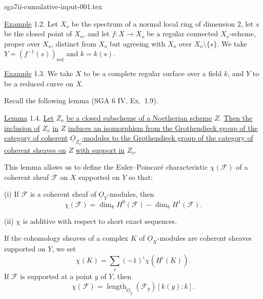 \begin{filecontents*}{sga7ii-cumulative-input-001.tex}

\underline{Example} 1.2. Let $X_o$ be the spectrum of a normal local ring of
dimension 2, let $s$ be the closed point of $X_o$, and let
$f:X\longrightarrow X_o$ be a regular connected $X_o$-scheme, proper over $X_o$,
distinct from $X_o$ but agreeing with $X_o$ over $X_o\setminus\{s\}$.  We take
$Y=(f^{-1}(s))_{\mathrm{red}}$ and $k=k(s)$.

\underline{Example} 1.3. We take $X$ to be a complete regular surface over a field
$k$, and $Y$ to be a reduced curve on $X$.

Recall the following lemma (SGA 6 IV, Ex.~1.9).

\underline{Lemma} 1.4. \underline{Let} $Z_o$ \underline{be a closed subscheme of a
Noetherian scheme} $Z$. \underline{Then the inclusion of} $Z_o$ \underline{in} $Z$
\underline{induces an isomorphism from the Grothendieck group of the category of
coherent} $\underline{O}_{Z_o}$\underline{-modules to the Grothendieck group of the
category of coherent sheaves on} $Z$ \underline{with support in} $Z_o$.

This lemma allows us to define the Euler--Poincaré characteristic $\chi(\mathcal F)$
of a coherent sheaf $\mathcal F$ on $X$ supported on $Y$ so that:

(i) If $\mathcal F$ is a coherent sheaf of $\underline{O}_Y$-modules, then
\begin{equation}\tag{1.4.1}
\chi(\mathcal F)=\dim_k H^0(\mathcal F)-\dim_k H^1(\mathcal F).
\end{equation}

(ii) $\chi$ is additive with respect to short exact sequences.

If the cohomology sheaves of a complex $K$ of $\underline{O}_X$-modules are coherent
sheaves supported on $Y$, we set
\begin{equation}\tag{1.4.2}
\chi(K)=\sum_i(-1)^i\chi(\underline{H}^i(K)).
\end{equation}
If $\mathcal F$ is supported at a point $y$ of $Y$, then
\begin{equation}\tag{1.4.3}
\chi(\mathcal F)=\operatorname{length}_{\underline{O}_y}(\mathcal F_y)[k(y):k].
\end{equation}



\end{filecontents*}
